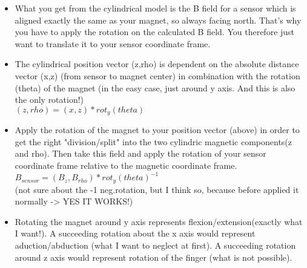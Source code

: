 \begin{itemize}
\item What you get from the cylindrical model is the B field for a sensor which is aligned exactly the same as your magnet, so always facing north. That's why you have to apply the rotation on the calculated B field. You therefore just want to translate it to your sensor coordinate frame.

\item The cylindrical position vector (z,rho) is dependent on the absolute distance vector (x,z) (from sensor to magnet center) in combination with the rotation (theta) of the magnet (in the easy case, just around y axis. And this is also the only rotation!)\\
$ (z,rho) = (x,z)*rot_{y}(theta) $

\item Apply the rotation of the magnet to your position vector (above) in order to get the right "division/split" into the two cylindric magnetic components(z and rho). Then take this field and apply the rotation of your sensor coordinate frame relative to the magnetic coordinate frame.\\
$ B_{sensor} = (B_{z},B_{rho})*rot_{y}(theta)^{-1} $\\
(not sure about the -1 neg.rotation, but I think so, because before applied it normally -> YES IT WORKS!)

\item Rotating the magnet around y axis represents flexion/extension(exactly what I want!).
A succeeding rotation about the x axis would represent aduction/abduction (what I want to neglect at first).
A succeeding rotation around z axis would represent rotation of the finger (what is not possible). 
\end{itemize}
